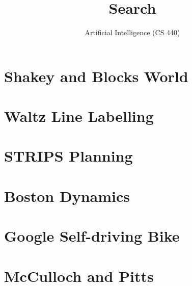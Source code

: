\documentclass[11pt]{article}
\title{Search}
\author{Artificial Intelligence (CS 440)}
\begin{document}
  \maketitle
  \tableofcontents

  \section{Shakey and Blocks World}
  \section{Waltz Line Labelling}
  \section{STRIPS Planning}
  \section{Boston Dynamics}
  \section{Google Self-driving Bike}
  \section{McCulloch and Pitts}
\end{document}
